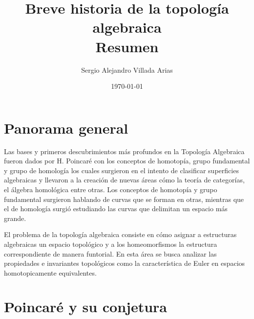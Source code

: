 \documentclass[12pt,letterpaper]{article}
\title{\vspace{-1.5cm}\textbf{Breve historia de la topología algebraica}\\[4pt]
\large Resumen}
\author{Sergio Alejandro Villada Arias} %
\date{\today}
\begin{document}
\maketitle

\section*{Panorama general}
Las bases y primeros descubrimientos más profundos en la Topología Algebraica fueron dados por H. Poincaré con los conceptos de homotopía, grupo fundamental y grupo de homología los cuales surgieron en el intento de clasificar superficies algebraicas y llevaron a la creación de nuevas áreas cómo la teoría de categorías, el álgebra homológica entre otras. Los conceptos de homotopía y grupo fundamental surgieron hablando de curvas que se forman en otras, mientras que el de homología surgió estudiando las curvas que delimitan un espacio más grande.

El problema de la topología algebraica consiste en cómo asignar a estructuras algebraicas un espacio topológico y a los homeomorfismos la estructura correspondiente de manera funtorial. En esta área se busca analizar las propiedades e invariantes topológicos como la característica de Euler en espacios homotopicamente equivalentes.

\section*{Poincaré y su conjetura}
\end{document}
